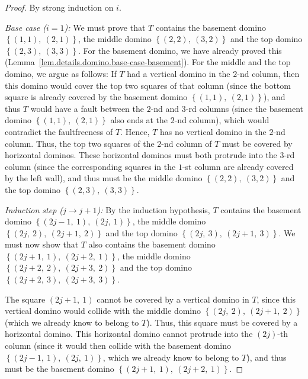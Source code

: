 \begin{proof}
By strong induction on $i$.

\emph{Base case ($i = 1$):}
We must prove that $T$
contains the basement domino $\left\{  \left(  1,1\right)  ,\ \left(
2,1\right)  \right\}  $, the middle domino $\left\{  \left(  2,2\right)
,\ \left(  3,2\right)  \right\}  $ and the top domino $\left\{  \left(
2,3\right)  ,\ \left(  3,3\right)  \right\}  $. For the basement domino, we
have already proved this (Lemma~\ref{lem.details.domino.base-case-basement}).
For the middle and the top domino, we argue as
follows: If $T$ had a vertical domino in the $2$-nd column, then this domino
would cover the top two squares of that column (since the bottom square is
already covered by the basement domino $\left\{  \left(  1,1\right)
,\ \left(  2,1\right)  \right\}  $), and thus $T$ would have a fault between
the $2$-nd and $3$-rd columns (since the basement domino $\left\{  \left(
1,1\right)  ,\ \left(  2,1\right)  \right\}  $ also ends at the $2$-nd
column), which would contradict the faultfreeness of $T$. Hence, $T$ has no
vertical domino in the $2$-nd column. Thus, the top two squares of the $2$-nd
column of $T$ must be covered by horizontal dominos. These horizontal dominos
must both protrude into the $3$-rd column (since the corresponding squares in
the $1$-st column are already covered by the left wall), and thus must be the
middle domino $\left\{  \left(  2,2\right)  ,\ \left(  3,2\right)  \right\}  $
and the top domino $\left\{  \left(  2,3\right)  ,\ \left(  3,3\right)
\right\}  $.

\emph{Induction step ($j \to j+1$):}
By the induction hypothesis, $T$ contains the basement domino $\left\{  \left(  2j-1,\ 1\right)
,\ \left(  2j,\ 1\right)  \right\}  $, the middle domino $\left\{  \left(
2j,\ 2\right)  ,\ \left(  2j+1,\ 2\right)  \right\}  $ and the top domino
$\left\{  \left(  2j,\ 3\right)  ,\ \left(  2j+1,\ 3\right)  \right\}  $. We
must now show that $T$ also
contains the basement domino $\left\{  \left(  2j+1,\ 1\right)  ,\ \left(
2j+2,\ 1\right)  \right\}  $, the middle domino $\left\{  \left(
2j+2,\ 2\right)  ,\ \left(  2j+3,\ 2\right)  \right\}  $ and the top domino
$\left\{  \left(  2j+2,\ 3\right)  ,\ \left(  2j+3,\ 3\right)  \right\}  $.

The square $\left(  2j+1,\ 1\right)  $ cannot be covered by a vertical
domino in $T$, since this vertical domino would collide with the middle domino
$\left\{  \left(  2j,\ 2\right)  ,\ \left(  2j+1,\ 2\right)  \right\}  $
(which we already know to belong to $T$). Thus, this square must be covered by
a horizontal domino. This horizontal domino cannot protrude into the $\left(
2j\right)  $-th column (since it would then collide with the basement domino
$\left\{  \left(  2j-1,\ 1\right)  ,\ \left(  2j,\ 1\right)  \right\}  $,
which we already know to belong to $T$), and thus must be the basement domino
$\left\{  \left(  2j+1,\ 1\right)  ,\ \left(  2j+2,\ 1\right)  \right\}  $.


\end{proof}
